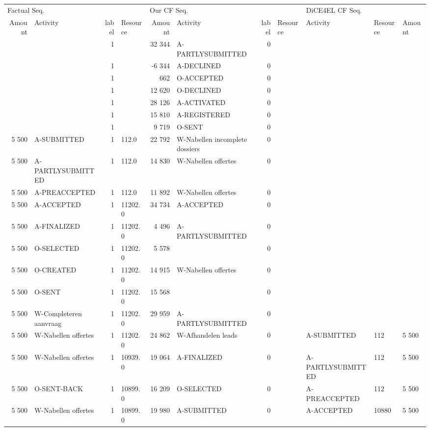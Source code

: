\begin{tabular}{rlrlrlrllll}
\toprule
\multicolumn{4}{l}{Factual Seq.} & \multicolumn{4}{l}{Our CF Seq.} & \multicolumn{3}{l}{DiCE4EL CF Seq.} \\
Amount & Activity & label & Resource & Amount & Activity & label & Resource & Activity & Resource & Amount \\
\midrule
 &  & 1 &  & 32 344 & A-PARTLYSUBMITTED & 0 &  &  &  &  \\
 &  & 1 &  & -6 344 & A-DECLINED & 0 &  &  &  &  \\
 &  & 1 &  & 662 & O-ACCEPTED & 0 &  &  &  &  \\
 &  & 1 &  & 12 620 & O-DECLINED & 0 &  &  &  &  \\
 &  & 1 &  & 28 126 & A-ACTIVATED & 0 &  &  &  &  \\
 &  & 1 &  & 15 810 & A-REGISTERED & 0 &  &  &  &  \\
 &  & 1 &  & 9 719 & O-SENT & 0 &  &  &  &  \\
5 500 & A-SUBMITTED & 1 & 112.0 & 22 792 & W-Nabellen incomplete dossiers & 0 &  &  &  &  \\
5 500 & A-PARTLYSUBMITTED & 1 & 112.0 & 14 830 & W-Nabellen offertes & 0 &  &  &  &  \\
5 500 & A-PREACCEPTED & 1 & 112.0 & 11 892 & W-Nabellen offertes & 0 &  &  &  &  \\
5 500 & A-ACCEPTED & 1 & 11202.0 & 34 734 & A-ACCEPTED & 0 &  &  &  &  \\
5 500 & A-FINALIZED & 1 & 11202.0 & 4 496 & A-PARTLYSUBMITTED & 0 &  &  &  &  \\
5 500 & O-SELECTED & 1 & 11202.0 & 5 578 &  & 0 &  &  &  &  \\
5 500 & O-CREATED & 1 & 11202.0 & 14 915 & W-Nabellen offertes & 0 &  &  &  &  \\
5 500 & O-SENT & 1 & 11202.0 & 15 568 &  & 0 &  &  &  &  \\
5 500 & W-Completeren aanvraag & 1 & 11202.0 & 29 959 & A-PARTLYSUBMITTED & 0 &  &  &  &  \\
5 500 & W-Nabellen offertes & 1 & 11202.0 & 24 862 & W-Afhandelen leads & 0 &  & A-SUBMITTED & 112 & 5 500 \\
5 500 & W-Nabellen offertes & 1 & 10939.0 & 19 064 & A-FINALIZED & 0 &  & A-PARTLYSUBMITTED & 112 & 5 500 \\
5 500 & O-SENT-BACK & 1 & 10899.0 & 16 209 & O-SELECTED & 0 &  & A-PREACCEPTED & 112 & 5 500 \\
5 500 & W-Nabellen offertes & 1 & 10899.0 & 19 980 & A-SUBMITTED & 0 &  & A-ACCEPTED & 10880 & 5 500 \\

\end{tabular}
